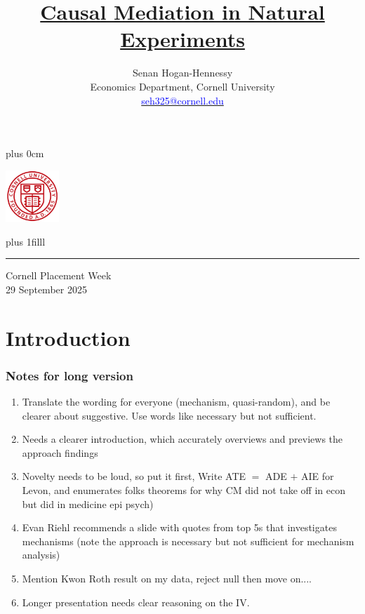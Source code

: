 \documentclass[dvipsnames]{beamer} %
\title{\color{titleText}
    \href{https://raw.githubusercontent.com/shoganhennessy/mediation-natural-experiment/main/mediation-natural-experiment-2025.pdf}{Causal Mediation in Natural Experiments}
}
\author[Senan Hogan-Hennessy, Cornell University]{
    Senan Hogan-Hennessy \\
    Economics Department, Cornell University \\ %
    \href{mailto:seh325@cornell.edu}{\textcolor{blue}{seh325@cornell.edu}}
}
\date{} %
\renewcommand{\raggedright}{\leftskip=0pt \rightskip=0pt plus 0cm}
\begin{document}
\raggedright
\begin{frame}
    \vspace{1.5cm}
    \titlepage
    \begin{center}
        \vspace{-1.5cm}
        \includegraphics[width=2cm]{presentation-files/cornell}

        \vskip0pt plus 1filll
        \par\noindent\rule{\textwidth}{0.4pt}
        Cornell Placement Week \\
        29 September 2025
    \end{center}
\end{frame}
\section{Introduction}
\begin{frame}
    \frametitle{Notes for long version}
    \begin{enumerate}
        \item Translate the wording for everyone (mechanism, quasi-random), and be clearer about suggestive.  Use words like necessary but not sufficient.
        \item Needs a clearer introduction, which accurately overviews and previews the approach findings
        \item Novelty needs to be loud, so put it first, Write ATE $=$ ADE $+$ AIE for Levon, and enumerates folks theorems for why CM did not take off in econ but did in medicine epi psych)
        \item Evan Riehl recommends a slide with quotes from top 5s that investigates mechanisms (note the approach is necessary but not sufficient for mechanism analysis) 
        \item Mention Kwon Roth result on my data, reject null then move on....
        \item Longer presentation needs clear reasoning on the IV.
    \end{enumerate}
\end{frame}
\end{document}
